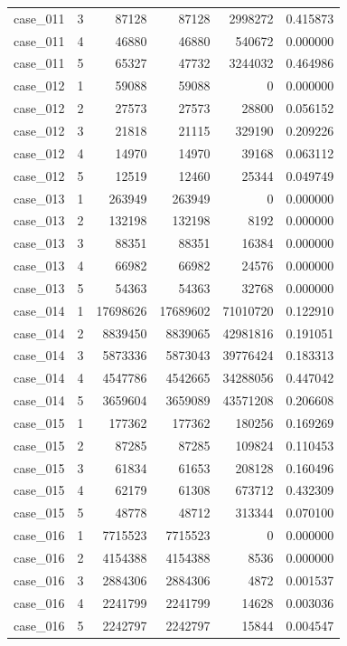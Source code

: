\begin{longtable}{lrrrrr}
case\_011 & 3 & 87128 & 87128 & 2998272 & 0.415873 \\
case\_011 & 4 & 46880 & 46880 & 540672 & 0.000000 \\
case\_011 & 5 & 65327 & 47732 & 3244032 & 0.464986 \\
case\_012 & 1 & 59088 & 59088 & 0 & 0.000000 \\
case\_012 & 2 & 27573 & 27573 & 28800 & 0.056152 \\
case\_012 & 3 & 21818 & 21115 & 329190 & 0.209226 \\
case\_012 & 4 & 14970 & 14970 & 39168 & 0.063112 \\
case\_012 & 5 & 12519 & 12460 & 25344 & 0.049749 \\
case\_013 & 1 & 263949 & 263949 & 0 & 0.000000 \\
case\_013 & 2 & 132198 & 132198 & 8192 & 0.000000 \\
case\_013 & 3 & 88351 & 88351 & 16384 & 0.000000 \\
case\_013 & 4 & 66982 & 66982 & 24576 & 0.000000 \\
case\_013 & 5 & 54363 & 54363 & 32768 & 0.000000 \\
case\_014 & 1 & 17698626 & 17689602 & 71010720 & 0.122910 \\
case\_014 & 2 & 8839450 & 8839065 & 42981816 & 0.191051 \\
case\_014 & 3 & 5873336 & 5873043 & 39776424 & 0.183313 \\
case\_014 & 4 & 4547786 & 4542665 & 34288056 & 0.447042 \\
case\_014 & 5 & 3659604 & 3659089 & 43571208 & 0.206608 \\
case\_015 & 1 & 177362 & 177362 & 180256 & 0.169269 \\
case\_015 & 2 & 87285 & 87285 & 109824 & 0.110453 \\
case\_015 & 3 & 61834 & 61653 & 208128 & 0.160496 \\
case\_015 & 4 & 62179 & 61308 & 673712 & 0.432309 \\
case\_015 & 5 & 48778 & 48712 & 313344 & 0.070100 \\
case\_016 & 1 & 7715523 & 7715523 & 0 & 0.000000 \\
case\_016 & 2 & 4154388 & 4154388 & 8536 & 0.000000 \\
case\_016 & 3 & 2884306 & 2884306 & 4872 & 0.001537 \\
case\_016 & 4 & 2241799 & 2241799 & 14628 & 0.003036 \\
case\_016 & 5 & 2242797 & 2242797 & 15844 & 0.004547 \\

\end{longtable}
